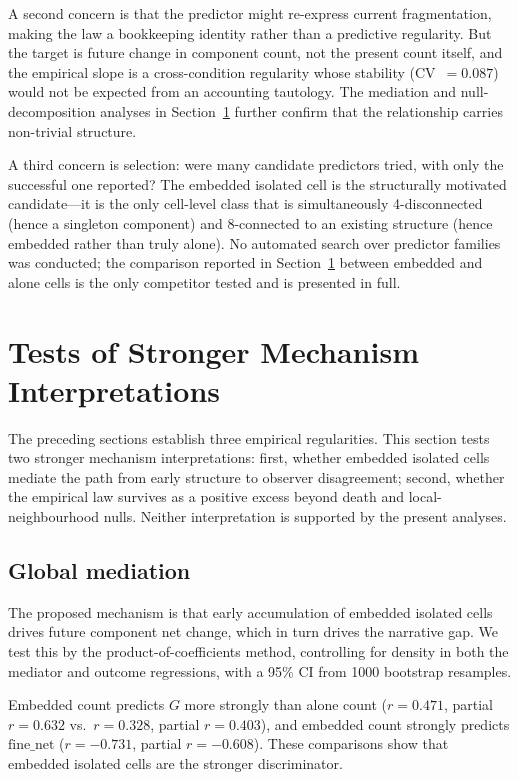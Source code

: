\documentclass[aip,cha,preprint,nofootinbib]{revtex4-2}
\newcommand{\fnet}{\mathrm{fine\_net}}
\begin{document}
A second concern is that the predictor might re-express current fragmentation,
making the law a bookkeeping identity rather than a predictive regularity.
But the target is future change in component count, not the present count
itself, and the empirical slope is a cross-condition regularity whose
stability (CV~$=0.087$) would not be expected from an accounting tautology.
The mediation and null-decomposition analyses in Section~\ref{sec:mechanism}
further confirm that the relationship carries non-trivial structure.

A third concern is selection: were many candidate predictors tried, with only
the successful one reported?
The embedded isolated cell is the structurally motivated candidate---it is the
only cell-level class that is simultaneously 4-disconnected (hence a singleton
component) and 8-connected to an existing structure (hence embedded rather than
truly alone).
No automated search over predictor families was conducted; the comparison
reported in Section~\ref{sec:mechanism} between embedded and alone cells is
the only competitor tested and is presented in full.

\section{Tests of Stronger Mechanism Interpretations}
\label{sec:mechanism}

The preceding sections establish three empirical regularities.
This section tests two stronger mechanism interpretations: first, whether
embedded isolated cells mediate the path from early structure to observer
disagreement; second, whether the empirical law survives as a positive excess
beyond death and local-neighbourhood nulls.
Neither interpretation is supported by the present analyses.

\subsection{Global mediation}

The proposed mechanism is that early accumulation of embedded isolated cells
drives future component net change, which in turn drives the narrative gap.
We test this by the product-of-coefficients method, controlling for density
in both the mediator and outcome regressions, with a 95\% CI from 1000
bootstrap resamples.

Embedded count predicts $G$ more strongly than alone count
($r=0.471$, partial $r=0.632$ vs.\ $r=0.328$, partial $r=0.403$),
and embedded count strongly predicts $\fnet$
($r=-0.731$, partial $r=-0.608$).
These comparisons show that embedded isolated cells are the stronger
discriminator.
\end{document}
